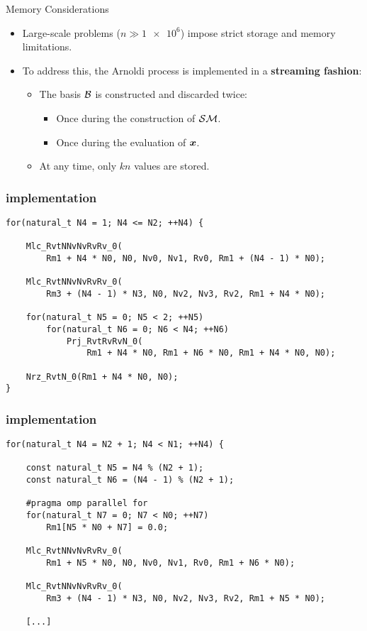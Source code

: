 \begin{frame}{Memory Considerations}
    \begin{itemize}
        \item Large-scale problems ($n \gg \num{1e6}$) impose strict storage and memory limitations.
        \item To address this, the Arnoldi process is implemented in a \textbf{streaming fashion}:
        \begin{itemize}
            \item The basis $\mathcal{B}$ is constructed and discarded twice:
            \begin{itemize}
                \item Once during the construction of $\mathcal{S} \mathcal{M}$.
                \item Once during the evaluation of $\bm{x}$.
            \end{itemize}
            \item At any time, only $k n$ values are stored.
        \end{itemize}
    \end{itemize}
\end{frame}

\begin{frame}[fragile] %
    \frametitle{implementation}

\begin{lstlisting}[style=cpp]
for(natural_t N4 = 1; N4 <= N2; ++N4) {

    Mlc_RvtNNvNvRvRv_0(
        Rm1 + N4 * N0, N0, Nv0, Nv1, Rv0, Rm1 + (N4 - 1) * N0);

    Mlc_RvtNNvNvRvRv_0(
        Rm3 + (N4 - 1) * N3, N0, Nv2, Nv3, Rv2, Rm1 + N4 * N0);

    for(natural_t N5 = 0; N5 < 2; ++N5)
        for(natural_t N6 = 0; N6 < N4; ++N6)
            Prj_RvtRvRvN_0(
                Rm1 + N4 * N0, Rm1 + N6 * N0, Rm1 + N4 * N0, N0);

    Nrz_RvtN_0(Rm1 + N4 * N0, N0);
}
\end{lstlisting}

\end{frame}

\begin{frame}[fragile] %
    \frametitle{implementation}

\begin{lstlisting}[style=cpp]
for(natural_t N4 = N2 + 1; N4 < N1; ++N4) {

    const natural_t N5 = N4 % (N2 + 1);
    const natural_t N6 = (N4 - 1) % (N2 + 1);

    #pragma omp parallel for
    for(natural_t N7 = 0; N7 < N0; ++N7)
        Rm1[N5 * N0 + N7] = 0.0;

    Mlc_RvtNNvNvRvRv_0(
        Rm1 + N5 * N0, N0, Nv0, Nv1, Rv0, Rm1 + N6 * N0);

    Mlc_RvtNNvNvRvRv_0(
        Rm3 + (N4 - 1) * N3, N0, Nv2, Nv3, Rv2, Rm1 + N5 * N0);

    [...]
\end{lstlisting}

\end{frame}

